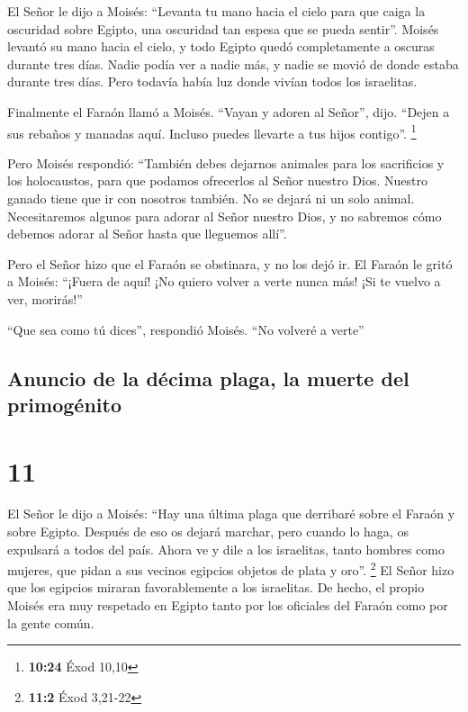  El Señor le dijo a Moisés: ``Levanta tu mano hacia el
cielo para que caiga la oscuridad sobre Egipto, una oscuridad tan espesa
que se pueda sentir''.  Moisés levantó su mano hacia el
cielo, y todo Egipto quedó completamente a oscuras durante tres días.
 Nadie podía ver a nadie más, y nadie se movió de donde
estaba durante tres días. Pero todavía había luz donde vivían todos los
israelitas.

 Finalmente el Faraón llamó a Moisés. ``Vayan y adoren al
Señor'', dijo. ``Dejen a sus rebaños y manadas aquí. Incluso puedes
llevarte a tus hijos contigo''. \footnote{\textbf{10:24} Éxod 10,10}

 Pero Moisés respondió: ``También debes dejarnos animales
para los sacrificios y los holocaustos, para que podamos ofrecerlos al
Señor nuestro Dios.  Nuestro ganado tiene que ir con
nosotros también. No se dejará ni un solo animal. Necesitaremos algunos
para adorar al Señor nuestro Dios, y no sabremos cómo debemos adorar al
Señor hasta que lleguemos allí''.

 Pero el Señor hizo que el Faraón se obstinara, y no los
dejó ir.  El Faraón le gritó a Moisés: ``¡Fuera de aquí!
¡No quiero volver a verte nunca más! ¡Si te vuelvo a ver, morirás!''

 ``Que sea como tú dices'', respondió Moisés. ``No
volveré a verte''

\hypertarget{anuncio-de-la-duxe9cima-plaga-la-muerte-del-primoguxe9nito}{%
\subsection{Anuncio de la décima plaga, la muerte del
primogénito}\label{anuncio-de-la-duxe9cima-plaga-la-muerte-del-primoguxe9nito}}

\hypertarget{section-10}{%
\section{11}\label{section-10}}

 El Señor le dijo a Moisés: ``Hay una última plaga que
derribaré sobre el Faraón y sobre Egipto. Después de eso os dejará
marchar, pero cuando lo haga, os expulsará a todos del país.
 Ahora ve y dile a los israelitas, tanto hombres como
mujeres, que pidan a sus vecinos egipcios objetos de plata y oro''.
\footnote{\textbf{11:2} Éxod 3,21-22}  El Señor hizo que
los egipcios miraran favorablemente a los israelitas. De hecho, el
propio Moisés era muy respetado en Egipto tanto por los oficiales del
Faraón como por la gente común.

